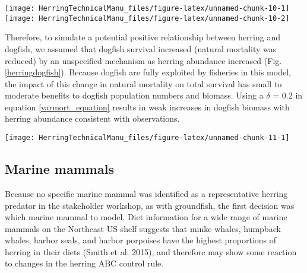 \documentclass[]{article}
\let\origfigure\figure
\let\endorigfigure\endfigure
\renewenvironment{figure}[1][2] {
    \expandafter\origfigure\expandafter[H]
} {
    \endorigfigure
}
\begin{document}
\begin{figure}

{\centering \texttt{[image: HerringTechnicalManu\_files/figure-latex/unnamed-chunk-10-1]} \texttt{[image: HerringTechnicalManu\_files/figure-latex/unnamed-chunk-10-2]} 

}

\caption{Dogfish population relationships with herring total biomass (left) and herring proportion in diet (right) \label{pupherring}}\label{fig:unnamed-chunk-10}
\end{figure}

Therefore, to simulate a potential positive relationship between herring
and dogfish, we assumed that dogfish survival increased (natural
mortality was reduced) by an unspecified mechanism as herring abundance
increased (Fig. \ref{herringdogfish}). Because dogfish are fully
exploited by fisheries in this model, the impact of this change in
natural mortality on total survival has small to moderate benefits to
dogfish population numbers and biomass. Using a \(\delta\) = 0.2 in
equation \ref{varmort_equation} results in weak increases in dogfish
biomass with herring abundance consistent with observations.

\begin{figure}

{\centering \texttt{[image: HerringTechnicalManu\_files/figure-latex/unnamed-chunk-11-1]} 

}

\caption{Modeled herring relative population size-dogfish natural mortality relationship \label{herringdogfish}}\label{fig:unnamed-chunk-11}
\end{figure}

\subsection{Marine mammals}\label{marine-mammals}

Because no specific marine mammal was identified as a representative
herring predator in the stakeholder workshop, as with groundfish, the
first decision was which marine mammal to model. Diet information for a
wide range of marine mammals on the Northeast US shelf suggests that
minke whales, humpback whales, harbor seals, and harbor porpoises have
the highest proportions of herring in their diets (Smith et al. 2015),
and therefore may show some reaction to changes in the herring ABC
control rule.
\end{document}
